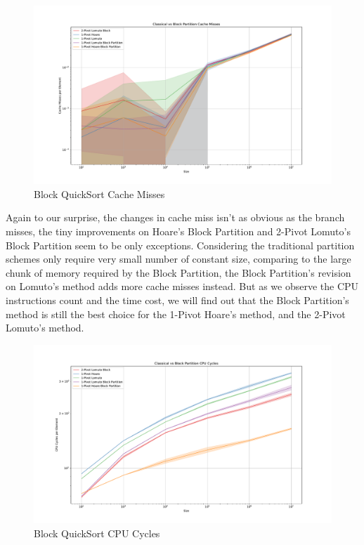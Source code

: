 \documentclass[a4paper,oneside,12pt]{book}
\begin{document}
\begin{figure}[H]
    \hypertarget{fig:blockcachemiss}{}
    \caption{Block QuickSort Cache Misses}
    \centering
    \hspace*{-0.27\textwidth}
    \includegraphics[width=1.5\textwidth]{Classical vs Block Partition Cache Misses.pdf}
\end{figure}

Again to our surprise, the changes in cache miss isn't as obvious as the branch misses, the tiny improvements on Hoare's Block Partition and 2-Pivot Lomuto's Block Partition seem to be only exceptions.
Considering the traditional partition schemes only require very small number of constant size, comparing to the large chunk of memory required by the Block Partition, the Block Partition's revision on Lomuto's method adds more cache misses instead.
But as we observe the CPU instructions count and the time cost, we will find out that the Block Partition's method is still the best choice for the 1-Pivot Hoare's method, and the 2-Pivot Lomuto's method.

\begin{figure}[H]
    \hypertarget{fig:blockcpucycles}{}
    \caption{Block QuickSort CPU Cycles}
    \centering
    \hspace*{-0.27\textwidth}
    \includegraphics[width=1.5\textwidth]{Classical vs Block Partition CPU Cycles.pdf}
\end{figure}
\end{document}
